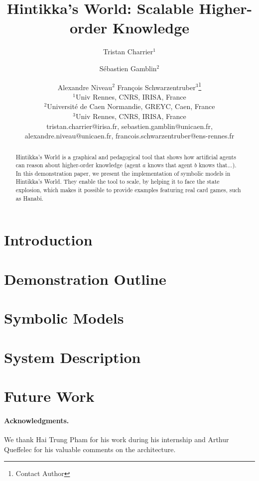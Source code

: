 \documentclass{article}
\title{Hintikka's World: Scalable Higher-order Knowledge}
\author{
Tristan Charrier$^1$\and
Sébastien Gamblin$^2$\and
Alexandre Niveau$^{2}$\And
François Schwarzentruber$^3$\footnote{Contact Author}\\
\affiliations
$^1$Univ Rennes, CNRS, IRISA, France\\
$^2$Université de Caen Normandie, GREYC, Caen, France\\
$^3$Univ Rennes, CNRS, IRISA, France\\
\emails
tristan.charrier@irisa.fr, 
sebastien.gamblin@unicaen.fr,
alexandre.niveau@unicaen.fr,
francois.schwarzentruber@ens-rennes.fr
}
\begin{document}
\newcommand{\mettel}{\textsf{MetTeL2}\xspace}
\newcommand{\citet}[1]{\citeauthor{#1}~\shortcite{#1}}

\maketitle

\begin{abstract}
	Hintikka's World is a graphical and pedagogical tool that shows how artificial agents can reason about higher-order knowledge (agent $a$ knows that agent $b$ knows that...).
	In this demonstration paper, we present the implementation of symbolic models in Hintikka's World. They enable the tool to scale, by helping it to face the state explosion, which makes it possible to provide examples featuring real card games, such as Hanabi.
\end{abstract}



\section{Introduction}


\section{Demonstration Outline}
\label{section:demonstration}



\section{Symbolic Models}
\label{section:symbolicmodels}








\section{System Description}
\label{section:architecture}


\section{Future Work}
\label{section:perspectives}


\vfill
\paragraph{Acknowledgments.}

We thank Hai Trung Pham for his work during his internship and Arthur Queffelec for his valuable comments on the architecture.








\newpage





\end{document}
